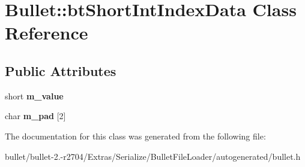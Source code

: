 \hypertarget{class_bullet_1_1bt_short_int_index_data}{\section{Bullet\+:\+:bt\+Short\+Int\+Index\+Data Class Reference}
\label{class_bullet_1_1bt_short_int_index_data}
}
\subsection*{Public Attributes}
\begin{DoxyCompactItemize}
\item 
\hypertarget{class_bullet_1_1bt_short_int_index_data_a05a3a3ee0045f66d8749209fc1c7c85d}{short {\bfseries m\+\_\+value}}\label{class_bullet_1_1bt_short_int_index_data_a05a3a3ee0045f66d8749209fc1c7c85d}

\item 
\hypertarget{class_bullet_1_1bt_short_int_index_data_a20044ccd6748035b8f932ff868b6b2c2}{char {\bfseries m\+\_\+pad} \mbox{[}2\mbox{]}}\label{class_bullet_1_1bt_short_int_index_data_a20044ccd6748035b8f932ff868b6b2c2}

\end{DoxyCompactItemize}


The documentation for this class was generated from the following file\+:\begin{DoxyCompactItemize}
\item 
bullet/bullet-\/2.-\/r2704/\+Extras/\+Serialize/\+Bullet\+File\+Loader/autogenerated/bullet.\+h\end{DoxyCompactItemize}
